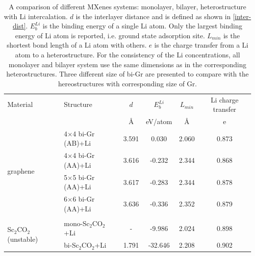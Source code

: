 \begin{table}[htbp]
{\footnotesize
\centering
\caption{A comparison of different MXenes systems: monolayer, bilayer, heterostructure with Li intercalation. $d$ is the interlayer distance and is defined as shown in \autoref{inter-dist}. $E_b^{Li}$ is the binding energy of a single Li atom. Only the largest binding energy of Li atom is reported, i.e. ground state adsorption site. $L_{min}$ is the shortest bond length of a Li atom with others. $e$ is the charge transfer from a Li atom to a heterostructure. For the consistency of the Li concentrations, all monolayer and bilayer system use the same dimensions as in the corresponding heterostructures. Three different size of bi-Gr are presented to compare with the hereostructures with corresponding size of Gr.} 
\label{my-label}
\begin{tabularx}{\textwidth}{llcccc}
\hline
Material      & Structure                         & $d$                & $E_b^{Li}$               & $L_{min}$ & Li charge transfer   \\
              &                                   & \AA                       & eV/atom                             & \AA                       & e                \\ \hline
\multirow{4}{*}{graphene}      & 4$\times$4 bi-Gr (AB)+Li                 & 3.591                    & 0.030                          & 2.060                     & 0.873                        \\
              & 4$\times$4 bi-Gr (AA)+Li                 & 3.616                                                                            & -0.232                         & 2.344                     & 0.868                        \\
              & 5$\times$5 bi-Gr (AA)+Li                  & 3.617                                                                          & -0.283                         & 2.344                     & 0.878                        \\
              & 6$\times$6 bi-Gr (AA)+Li                  & 3.636                                                                         & -0.336                         & 2.352                     & 0.879                        \\ 
& & & & \\              
\multirow{3}{*}{Sc$_2$CO$_2$ (unstable)}    & mono-Sc$_2$CO$_2$+Li  & -  & -9.986  & 2.024  & 0.898 \\
              & bi-Sc$_2$CO$_2$+Li   & 1.791              & -32.646 & 2.208  & 0.902 \\

\end{tabularx}}
\end{table}
